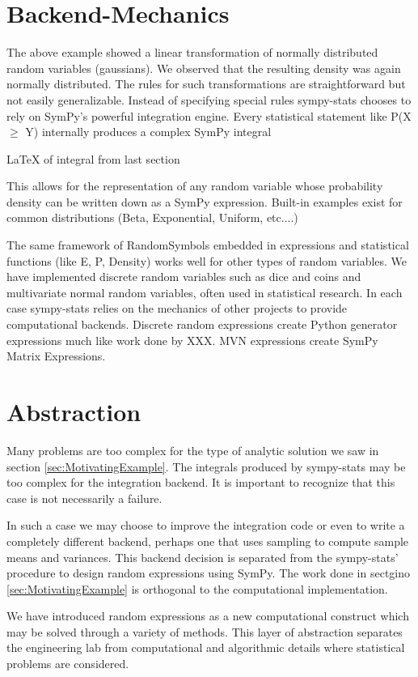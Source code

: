 \section{Backend-Mechanics}
The above example showed a linear transformation of normally distributed random variables (gaussians). We observed that the resulting density was again normally distributed. The rules for such transformations are straightforward but not easily generalizable. Instead of specifying special rules sympy-stats chooses to rely on SymPy's powerful integration engine. Every statistical statement like P(X $\ge$ Y) internally produces a complex SymPy integral

LaTeX of integral from last section

This allows for the representation of any random variable whose probability density can be written down as a SymPy expression. Built-in examples exist for common distributions (Beta, Exponential, Uniform, etc....)

The same framework of RandomSymbols embedded in expressions and statistical functions (like E, P, Density) works well for other types of random variables. We have implemented discrete random variables such as dice and coins and multivariate normal random variables, often used in statistical research. In each case sympy-stats relies on the mechanics of other projects to provide computational backends. Discrete random expressions create Python generator expressions much like work done by XXX. MVN expressions create SymPy Matrix
Expressions.

\section{Abstraction}
Many problems are too complex for the type of analytic solution we saw in section \ref{sec:MotivatingExample}. The integrals produced by sympy-stats may be too complex for the integration backend. It is important to recognize that this case is not necessarily a failure.

In such a case we may choose to improve the integration code or even to write a completely different backend, perhaps one that uses sampling to compute sample means and variances. This backend decision is separated from the sympy-stats' procedure to design random expressions using SymPy. The work done in sectgino \ref{sec:MotivatingExample} is orthogonal to the computational implementation.

We have introduced random expressions as a new computational construct which may be solved through a variety of methods. This layer of abstraction separates the engineering lab from computational and algorithmic details where statistical problems are considered.
